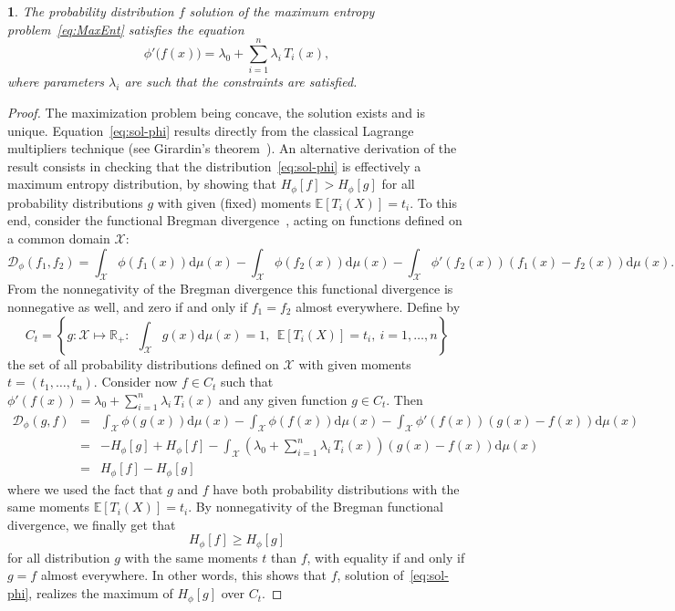 \documentclass[english,sort&compress]{elsarticle}
\theoremstyle{definition}
\theoremstyle{plain}
\newtheorem{prop}{\protect\propositionname}
\theoremstyle{plain}
\providecommand{\propositionname}{Proposition}
\def\dmu{\mathrm{d}\mu}
\def\fD{\mathcal{D}}
\def\Rset{\mathbb{R}}
\def\X{\mathcal{X}}
\newcommand{\Esp}[1]{\mathbb{E}\left[ #1 \right]}
\begin{document}
\begin{prop}\label{prop:sol-phi}
  The   probability   distribution  $f$   solution   of   the  maximum   entropy
  problem~\eqref{eq:MaxEnt} satisfies the equation
  \begin{equation}\label{eq:sol-phi}
    \phi'\big(f(x)\big) = \lambda_0 + \sum_{i=1}^n \lambda_i \, T_i(x),
  \end{equation}
  where parameters $\lambda_i$ are such that the constraints are satisfied.
\end{prop}
%
\begin{proof}
  The maximization  problem being  concave, the solution  exists and  is unique.
  Equation~\eqref{eq:sol-phi}  results  directly  from  the  classical  Lagrange
  multipliers technique (see Girardin's theorem~\cite{Girardin}).
  An  alternative  derivation  of  the  result consists  in  checking  that  the
  distribution~\eqref{eq:sol-phi} is effectively a maximum entropy distribution,
  by showing that $H_\phi[f] >  H_\phi[g]$ for all probability distributions $g$
  with given  (fixed) moments $\Esp{T_i(X)} =  t_i$.  To this  end, consider the
  functional Bregman  divergence~\cite{Bas13}, acting on functions  defined on a
  common domain $\X$:
  \begin{equation}
  \label{eq:FctBregman}
  \fD_\phi(f_1,f_2)  =  \int_\X  \phi(f_1(x))  \dmu(x)  -  \int_\X  \phi(f_2(x))
  \dmu(x) - \int_\X \phi'(f_2(x)) \left( f_1(x) - f_2(x) \right) \dmu(x).
  \end{equation}
  From the nonnegativity of the Bregman divergence this functional divergence is
  nonnegative  as   well,  and  zero  if   and  only  if  $f_1   =  f_2$  almost
  everywhere. Define by
  \[
  C_t =  \left\{ g: \X  \mapsto \Rset_+  : \:\: \int_\X  g(x) \dmu(x) =  1, \:\:
    \Esp{T_i(X)} = t_i, \: i = 1, \ldots , n \right\}
  \]
  the set of all probability distributions defined on $\X$ with given moments $t
  =  (t_1,\ldots,t_n)$.  Consider  now  $f  \in C_t$  such  that $\phi'(f(x))  =
  {\displaystyle \lambda_0  + \sum_{i=1}^n \lambda_i  \, T_i(x)}$ and  any given
  function $g \in C_t$. Then
  \begin{eqnarray*}
  \fD_\phi(g,f) & = & \int_\X \phi(g(x)) \dmu(x) - \int_\X \phi(f(x)) \dmu(x) -
  \int_\X \phi'(f(x)) \left( g(x) - f(x) \right) \dmu(x)
  \\[2mm]
  & = & - H_\phi[g] + H_\phi[f] - \int_\X \left( \lambda_0 + \sum_{i=1}^n
  \lambda_i \, T_i(x) \right) \left( g(x) - f(x) \right) \dmu(x)
  \\[2mm]
  & = & H_\phi[f] - H_\phi[g]
  \end{eqnarray*}
  where  we  used the  fact  that $g$  and  $f$  have both  probability
  distributions with the same moments $\Esp{T_i(X)} = t_i$.  By nonnegativity of
  the Bregman functional divergence, we finally get that
  \[
  H_\phi[f] \ge H_\phi[g]
  \]
  for all distribution $g$ with the  same moments $t$ than $f$, with equality if
  and only if $g  = f$ almost everywhere.  In other words,  this shows that $f$,
  solution  of~\eqref{eq:sol-phi},  realizes  the  maximum of  $H_\phi[g]$  over
  $C_t$.
\end{proof}
\end{document}
